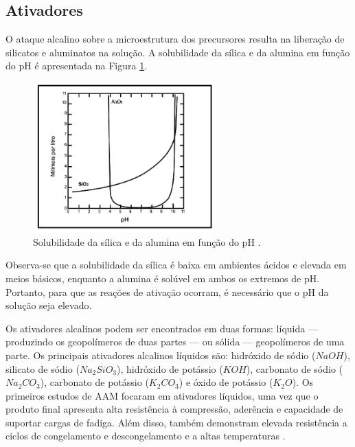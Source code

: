 

\subsection{Ativadores}

O ataque alcalino sobre a microestrutura dos precursores resulta na liberação de silicatos e aluminatos na solução.
A solubilidade da sílica e da alumina em função do pH é apresentada na Figura \ref{fig:solubilidade}.

\begin{figure}[ht]
  \centering
  \includegraphics[width=0.625\textwidth]{Cap2/solubilidade.png}
  \caption{Solubilidade da sílica e da alumina em função do pH \cite{mason1952principles}.}
  \label{fig:solubilidade}
\end{figure}

Observa-se que a solubilidade da sílica é baixa em ambientes ácidos e elevada em meios básicos, enquanto a alumina é solúvel em ambos os extremos de pH.
Portanto, para que as reações de ativação ocorram, é necessário que o pH da solução seja elevado.

Os ativadores alcalinos podem ser encontrados em duas formas: líquida — produzindo os geopolímeros de duas partes — ou sólida — geopolímeros de uma parte.
Os principais ativadores alcalinos líquidos são: hidróxido de sódio ($NaOH$), silicato de sódio ($Na_2SiO_3$), hidróxido de potássio ($KOH$), carbonato de sódio ($Na_2CO_3$), carbonato de potássio ($K_2CO_3$) e óxido de potássio ($K_2O$).
Os primeiros estudos de AAM focaram em ativadores líquidos, uma vez que o produto final apresenta alta resistência à compressão, aderência e capacidade de suportar cargas de fadiga. Além disso, também demonstram elevada resistência a ciclos de congelamento e descongelamento e a altas temperaturas \cite{heath2014gwp}.

